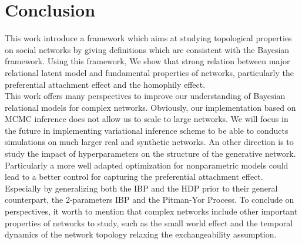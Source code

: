 \section{Conclusion}
\label{sec:concl}

This work introduce a framework which aims at studying topological properties on social networks by giving definitions which are consistent with the Bayesian framework. Using this framework, We show that strong relation between major relational latent model and fundamental properties of networks, particularly the preferential attachment effect and the homophily effect.~\\ 

This work offers many perspectives to improve our understanding of Bayesian relational models for complex networks. Obviously, our implementation based on MCMC inference does not allow us to scale to large networks. We will focus in the future in implementing variational inference scheme to be able to conducts simulations on much larger real and synthetic networks. An other direction is to study the impact of hyperparameters on the structure of the generative network. Particularly a more well adapted optimization for nonparametric models could lead to a better control for capturing the preferential attachment effect. Especially by generalizing both the IBP and the HDP prior to their general counterpart, the 2-parameters IBP and the Pitman-Yor Process. To conclude on perspectives, it worth to mention that complex networks include other important properties of networks to study, such as the small world effect and the temporal dynamics of the network topology relaxing the exchangeability assumption.
